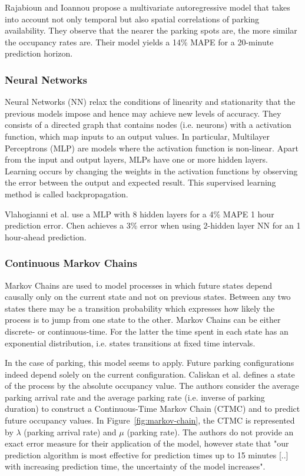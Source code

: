 \documentclass{article}
\begin{document}
\vspace{2mm}
Rajabioun and Ioannou\cite{Rajabioun} propose a multivariate autoregressive model that takes into account not only temporal but also spatial correlations of parking availability. They observe that the nearer the parking spots are, the more similar the occupancy rates are. Their model yields a 14\% MAPE for a 20-minute prediction horizon.

\subsubsection{Neural Networks}
Neural Networks (NN) relax the conditions of linearity and stationarity that the previous models impose and hence may achieve new levels of accuracy. They consists of a directed graph that contains nodes (i.e. neurons) with a  activation function, which map inputs to an output values. In particular, Multilayer Perceptrons (MLP) are models where the activation function is non-linear. Apart from the input and output layers, MLPs have one or more hidden layers. Learning occurs by changing the weights in the activation functions by observing the error between the output and expected result. This supervised learning method is called backpropagation.

\vspace{2mm}
Vlahogianni et al.\cite{Vlahogianni} use a MLP with 8 hidden layers for a 4\% MAPE 1 hour prediction error. Chen\cite{Chen} achieves a 3\% error when using 2-hidden layer NN for an 1 hour-ahead prediction.

\subsubsection{Continuous Markov Chains}
Markov Chains are used to model processes in which future states depend causally only on the current state and not on previous states. Between any two states there may be a transition probability which expresses how likely the process is to jump from one state to the other. Markov Chains can be either discrete- or continuous-time. For the latter the time spent in each state has an exponential distribution, i.e. states transitions at fixed time intervals.

\vspace{2mm}
In the case of parking, this model seems to apply. Future parking configurations indeed depend solely on the current configuration. Caliskan et al.\cite{Caliskan2007} defines a state of the process by the absolute occupancy value. The authors consider the average parking arrival rate and the average parking rate (i.e. inverse of parking duration) to construct a Continuous-Time Markov Chain (CTMC) and to predict future occupancy values. In Figure~\ref{fig:markov-chain}, the CTMC is represented by $\lambda$ (parking arrival rate) and $\mu$ (parking rate). The authors do not provide an exact error measure for their application of the model, however state that "our prediction algorithm is most effective for prediction times up to 15 minutes [..] with increasing prediction time, the uncertainty of the model increases".
\end{document}

